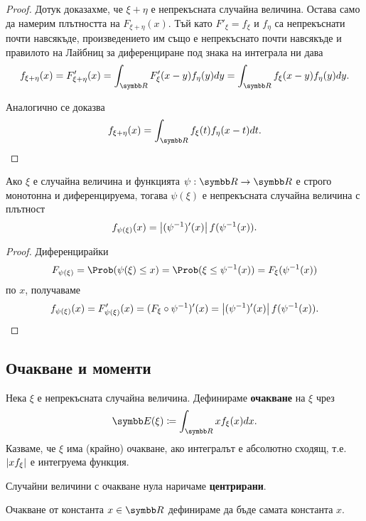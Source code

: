 \documentclass[numbers=endperiod, bibliography=totocnumbered]{scrartcl}
\begin{document}
\begin{proof}
  Дотук доказахме, че \( \xi + \eta \) е непрекъсната случайна величина. Остава само да намерим плътността на \( F_{\xi + \eta}(x) \). Тъй като \( F'_\xi = f_\xi \) и \( f_\eta \) са непрекъснати почти навсякъде, произведението им също е непрекъснато почти навсякъде и правилото на Лайбниц за диференциране под знака на интеграла ни дава
  \begin{equation*}
    f_{\xi + \eta} (x)
    =
    F'_{\xi + \eta} (x)
    =
    \int_{\R} F'_\xi(x - y) f_\eta(y) dy
    =
    \int_{\R} f_\xi(x - y) f_\eta(y) dy.
  \end{equation*}

  Аналогично се доказва
  \begin{equation*}
    f_{\xi + \eta} (x)
    =
    \int_{\R} f_\xi(t) f_\eta(x - t) dt.
  \end{equation*}
\end{proof}

\begin{proposition}\label{thm:density_of_transformed_variable}
  Ако \( \xi \) е случайна величина и функцията \( \psi: \R \to \R \) е строго монотонна и диференцируема, тогава \( \psi(\xi) \) е непрекъсната случайна величина с плътност
  \begin{equation*}
    f_{\psi(\xi)} (x)
    =
    \left\vert (\psi^{-1})'(x) \right\vert f(\psi^{-1}(x)).
  \end{equation*}
\end{proposition}
\begin{proof} Диференцирайки
  \begin{equation*}
    F_{\psi(\xi)} = \Prob(\psi(\xi) \leq x) = \Prob(\xi \leq \psi^{-1}(x)) = F_\xi(\psi^{-1}(x))
  \end{equation*}
  по \( x \), получаваме
  \begin{equation*}
    f_{\psi(\xi)} (x)
    =
    F'_{\psi(\xi)} (x)
    =
    (F_{\xi} \circ \psi^{-1})'(x)
    =
    \left\vert (\psi^{-1})'(x) \right\vert f(\psi^{-1}(x)).
  \end{equation*}
\end{proof}

\subsection{Очакване и моменти}

\begin{definition}
  Нека \( \xi \) е непрекъсната случайна величина. Дефинираме \textbf{очакване} на \( \xi \) чрез
  \begin{equation*}
    \Expect(\xi) \coloneqq \int_{\R} x f_\xi(x) dx.
  \end{equation*}
  Казваме, че \( \xi \) има (крайно) очакване, ако интегралът е абсолютно сходящ, т.е. \( \left\vert x f_\xi \right\vert \) е интегруема функция.

  Случайни величини с очакване нула наричаме \textbf{центрирани}.

  Очакване от константа \( x \in \R \) дефинираме да бъде самата константа \( x \).
\end{definition}
\end{document}
